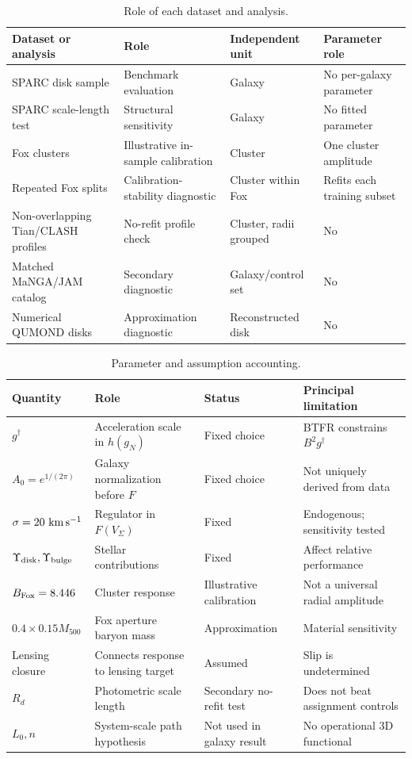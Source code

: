 \documentclass[aps,prd,reprint,superscriptaddress,showpacs,floatfix,longbibliography]{revtex4-2}
\begin{document}
\begin{table}[t]
\caption{\label{tab:roles}Role of each dataset and analysis.}
\begin{ruledtabular}
\begin{tabular}{llll}
Dataset or analysis & Role & Independent unit & Parameter role\\
\hline
SPARC disk sample & Benchmark evaluation & Galaxy & No per-galaxy parameter\\
SPARC scale-length test & Structural sensitivity & Galaxy & No fitted parameter\\
Fox clusters & Illustrative in-sample calibration & Cluster & One cluster amplitude\\
Repeated Fox splits & Calibration-stability diagnostic & Cluster within Fox & Refits each training subset\\
Non-overlapping Tian/CLASH profiles & No-refit profile check & Cluster, radii grouped & No\\
Matched MaNGA/JAM catalog & Secondary diagnostic & Galaxy/control set & No\\
Numerical QUMOND disks & Approximation diagnostic & Reconstructed disk & No\\
\end{tabular}
\end{ruledtabular}
\end{table}

\begin{table}[t]
\caption{\label{tab:parameters}Parameter and assumption accounting.}
\begin{ruledtabular}
\begin{tabular}{llll}
Quantity & Role & Status & Principal limitation\\
\hline
$g^\dagger$ & Acceleration scale in $h(g_N)$ & Fixed choice & BTFR constrains $B^2g^\dagger$\\
$A_0=e^{1/(2\pi)}$ & Galaxy normalization before $F$ & Fixed choice & Not uniquely derived from data\\
$\sigma=20\ {\rm km\,s^{-1}}$ & Regulator in $F(V_\Sigma)$ & Fixed & Endogenous; sensitivity tested\\
$\Upsilon_{\rm disk},\Upsilon_{\rm bulge}$ & Stellar contributions & Fixed & Affect relative performance\\
$B_{\rm Fox}=8.446$ & Cluster response & Illustrative calibration & Not a universal radial amplitude\\
$0.4\times0.15M_{500}$ & Fox aperture baryon mass & Approximation & Material sensitivity\\
Lensing closure & Connects response to lensing target & Assumed & Slip is undetermined\\
$R_d$ & Photometric scale length & Secondary no-refit test & Does not beat assignment controls\\
$L_0,n$ & System-scale path hypothesis & Not used in galaxy result & No operational 3D functional\\
\end{tabular}
\end{ruledtabular}
\end{table}
\end{document}
